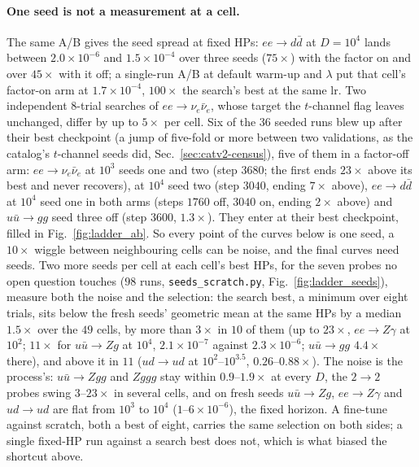 \documentclass[11pt]{article}
\newcommand{\code}[1]{\texttt{#1}}
\begin{document}
\paragraph{One seed is not a measurement at a cell.} The same A/B gives the seed spread at fixed
HPs: $ee\to d\bar d$ at $D=10^4$ lands between $2.0\times10^{-6}$ and $1.5\times10^{-4}$ over
three seeds ($75\times$) with the factor on and over $45\times$ with it off; a single-run A/B at
default warm-up and $\lambda$ put that cell's factor-on arm at $1.7\times10^{-4}$, $100\times$
the search's best at the same lr. Two independent $8$-trial searches of $ee\to\nu_e\bar\nu_e$,
whose target the $t$-channel flag leaves unchanged, differ by up to $5\times$ per cell. Six of the
$36$ seeded runs blew up after their best checkpoint (a jump of five-fold or more between two
validations, as the catalog's $t$-channel seeds did, Sec.~\ref{sec:catv2-census}), five of them in
a factor-off arm: $ee\to\nu_e\bar\nu_e$ at $10^3$ seeds one and two (step $3680$; the first ends
$23\times$ above its best and never recovers), at $10^4$ seed two (step $3040$, ending $7\times$
above), $ee\to d\bar d$ at $10^4$ seed one in both arms (steps $1760$ off, $3040$ on, ending
$2\times$ above) and $u\bar u\to gg$ seed three off (step $3600$, $1.3\times$). They enter at their
best checkpoint, filled in Fig.~\ref{fig:ladder_ab}. So every point of the curves below is one
seed, a $10\times$ wiggle between neighbouring cells can be noise, and the final curves need seeds.
Two more seeds per cell at each cell's best HPs, for the seven probes no open question touches ($98$
runs, \code{seeds\_scratch.py}, Fig.~\ref{fig:ladder_seeds}), measure both the noise and the selection:
the search best, a minimum over eight trials, sits below the fresh seeds' geometric mean at the same
HPs by a median $1.5\times$ over the $49$ cells, by more than $3\times$ in $10$ of them (up to $23\times$,
$ee\to Z\gamma$ at $10^2$; $11\times$ for $u\bar u\to Zg$ at $10^4$, $2.1\times10^{-7}$ against
$2.3\times10^{-6}$; $u\bar u\to gg$ $4.4\times$ there), and above it in $11$ ($ud\to ud$ at
$10^2$--$10^{3.5}$, $0.26$--$0.88\times$). The noise is the process's: $u\bar u\to Zgg$ and $Zggg$ stay
within $0.9$--$1.9\times$ at every $D$, the $2\to2$ probes swing $3$--$23\times$ in several cells, and
on fresh seeds $u\bar u\to Zg$, $ee\to Z\gamma$
and $ud\to ud$ are flat from $10^3$ to $10^4$ ($1$--$6\times10^{-6}$), the fixed horizon. A fine-tune
against scratch, both a best of eight, carries the same selection on both sides; a single fixed-HP run
against a search best does not, which is what biased the shortcut above.
\end{document}

